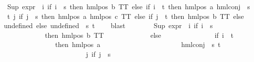 \begin{isabellebody}
\ {\isacartoucheopen}Sup\ {\isacharparenleft}{\kern0pt}{\isacharparenleft}{\kern0pt}expr{\isacharunderscore}{\kern0pt}{}\ {\isasymcirc}\ {\isacharparenleft}{\kern0pt}{\isasymlambda}i{\isachardot}{\kern0pt}\ if\ i\ {\isacharequal}{\kern0pt}\ s\ then\ hml{\isacharunderscore}{\kern0pt}pos\ b\ TT\ else\ if\ i\ {\isacharequal}{\kern0pt}\ t\ then\ hml{\isacharunderscore}{\kern0pt}pos\ a\ {\isacharparenleft}{\kern0pt}hml{\isacharunderscore}{\kern0pt}conj\ {\isacharbraceleft}{\kern0pt}{\isacharbraceright}{\kern0pt}\ {\isacharbraceleft}{\kern0pt}s{\isacharcomma}{\kern0pt}\ t{\isacharbraceright}{\kern0pt}\ {\isacharparenleft}{\kern0pt}{\isasymlambda}j{\isachardot}{\kern0pt}\ if\ j\ {\isacharequal}{\kern0pt}\ s\ then\ hml{\isacharunderscore}{\kern0pt}pos\ a\ {\isacharparenleft}{\kern0pt}hml{\isacharunderscore}{\kern0pt}pos\ c\ TT{\isacharparenright}{\kern0pt}\ else\ if\ j\ {\isacharequal}{\kern0pt}\ t\ then\ hml{\isacharunderscore}{\kern0pt}pos\ b\ TT\ else\ undefined{\isacharparenright}{\kern0pt}{\isacharparenright}{\kern0pt}\ else\ undefined{\isacharparenright}{\kern0pt}{\isacharparenright}{\kern0pt}\ {\isacharbackquote}{\kern0pt}\ {\isacharbraceleft}{\kern0pt}s{\isacharcomma}{\kern0pt}\ t{\isacharbraceright}{\kern0pt}{\isacharparenright}{\kern0pt}\ {\isacharequal}{\kern0pt}\ {}{\isacartoucheclose}\ \isamarkupfalse%
\ blast\isanewline
\ \ \ \ \ \ \isamarkupfalse%
\ {\isachardoublequoteopen}{\isacharparenleft}{\kern0pt}Sup\ {\isacharparenleft}{\kern0pt}{\isacharparenleft}{\kern0pt}expr{\isacharunderscore}{\kern0pt}{}\ {\isasymcirc}\ {\isacharparenleft}{\kern0pt}{\isasymlambda}i{\isachardot}{\kern0pt}\ {\isacharparenleft}{\kern0pt}if\ i\ {\isacharequal}{\kern0pt}\ s\ \isanewline
\ \ \ \ \ \ \ \ \ \ \ \ then\ {\isacharparenleft}{\kern0pt}hml{\isacharunderscore}{\kern0pt}pos\ b\ TT{\isacharparenright}{\kern0pt}\ \isanewline
\ \ \ \ \ \ \ \ \ \ \ \ else\ \isanewline
\ \ \ \ \ \ \ \ \ \ \ \ \ \ {\isacharparenleft}{\kern0pt}if\ i\ {\isacharequal}{\kern0pt}\ t\ \ \isanewline
\ \ \ \ \ \ \ \ \ \ \ \ \ \ \ then\ {\isacharparenleft}{\kern0pt}hml{\isacharunderscore}{\kern0pt}pos\ a\ \isanewline
\ \ \ \ \ \ \ \ \ \ \ \ \ \ \ \ \ \ \ \ \ \ {\isacharparenleft}{\kern0pt}hml{\isacharunderscore}{\kern0pt}conj\ {\isacharbraceleft}{\kern0pt}{\isacharbraceright}{\kern0pt}\ {\isacharbraceleft}{\kern0pt}s{\isacharcomma}{\kern0pt}\ t{\isacharbraceright}{\kern0pt}\ \isanewline
\ \ \ \ \ \ \ \ \ \ \ \ \ \ \ \ \ \ \ \ \ \ \ \ {\isacharparenleft}{\kern0pt}{\isasymlambda}j{\isachardot}{\kern0pt}\ {\isacharparenleft}{\kern0pt}if\ j\ {\isacharequal}{\kern0pt}\ s\ \isanewline

\end{isabellebody}
